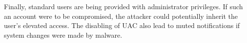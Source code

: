 Finally, standard users are being provided with administrator privileges. If such an account were to be compromised, the attacker could potentially inherit the user's elevated access. The disabling of UAC also lead to muted notifications if system changes were made by malware.



